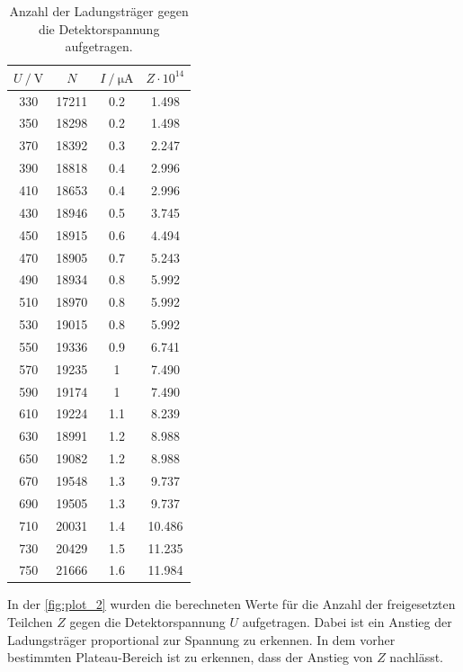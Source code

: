 \begin{table}[H]
    \centering
    \caption{Anzahl der Ladungsträger gegen die Detektorspannung aufgetragen.}
    \label{tab:ladungs}
\begin{tabular}{c c c c}
    \toprule
    $U \mathbin{/} \mathrm{V}$ & $N$ &  $I \mathbin{/} \unit{\micro\ampere}$ & $Z \cdot 10^{14}$\\
    \midrule
         330 &    17211 &   0.2 & 1.498\\
         350 &    18298 &   0.2 & 1.498\\
         370 &    18392 &   0.3 & 2.247\\
         390 &    18818 &   0.4 & 2.996\\
         410 &    18653 &   0.4 & 2.996\\
         430 &    18946 &   0.5 & 3.745\\
         450 &    18915 &   0.6 & 4.494\\
         470 &    18905 &   0.7 & 5.243\\
         490 &    18934 &   0.8 & 5.992\\
         510 &    18970 &   0.8 & 5.992\\
         530 &    19015 &   0.8 & 5.992\\
         550 &    19336 &   0.9 & 6.741\\
         570 &    19235 &     1 & 7.490\\
         590 &    19174 &     1 & 7.490\\
         610 &    19224 &   1.1 & 8.239\\
         630 &    18991 &   1.2 & 8.988\\
         650 &    19082 &   1.2 & 8.988\\
         670 &    19548 &   1.3 & 9.737\\
         690 &    19505 &   1.3 & 9.737\\
         710 &    20031 &   1.4 & 10.486\\
         730 &    20429 &   1.5 & 11.235\\
         750 &    21666 &   1.6 & 11.984\\
    \bottomrule
    \end{tabular}
\end{table}

In der \autoref{fig:plot_2} wurden die berechneten Werte für die Anzahl der freigesetzten Teilchen $Z$ gegen die Detektorspannung $U$
aufgetragen. Dabei ist ein Anstieg der Ladungsträger proportional zur Spannung zu erkennen. In dem vorher bestimmten
Plateau-Bereich ist zu erkennen, dass der Anstieg von $Z$ nachlässt.

